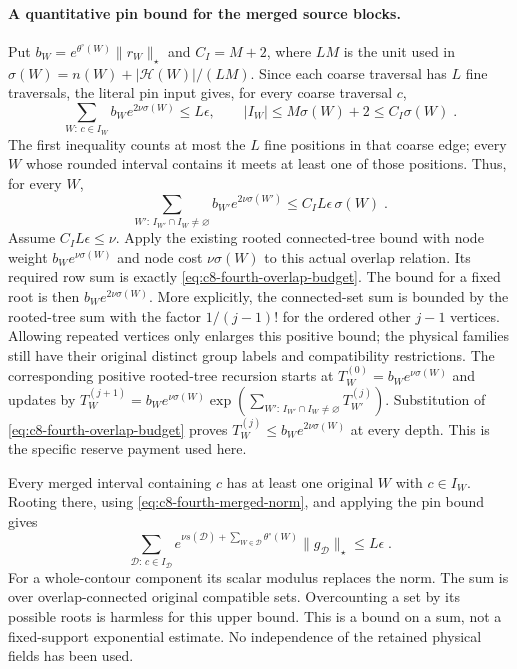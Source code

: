 \documentclass[11pt]{article}
\begin{document}
\paragraph{A quantitative pin bound for the merged source blocks.}
Put $b_W=e^{\theta^\circ(W)}\|r_W\|_\star$ and
$C_I=M+2$, where $LM$ is the unit used in
$\sigma(W)=n(W)+|\mathcal H(W)|/(LM)$. Since each coarse
traversal has $L$ fine traversals, the literal pin input gives,
for every coarse traversal $c$,
\begin{equation}\label{eq:c8-fourth-coarse-pin-input}
    \sum_{W:\,c\in I_W}b_We^{2\nu\sigma(W)}
        \leq L\epsilon,\qquad
    |I_W|\leq M\sigma(W)+2\leq C_I\sigma(W)\;.
\end{equation}
The first inequality counts at most the $L$ fine positions
in that coarse edge; every $W$ whose rounded interval contains
it meets at least one of those positions.
Thus, for every $W$,
\begin{equation}\label{eq:c8-fourth-overlap-budget}
    \sum_{W':\,I_{W'}\cap I_W\neq\varnothing}
        b_{W'}e^{2\nu\sigma(W')}
        \leq C_I L\epsilon\,\sigma(W)\;.
\end{equation}
Assume $C_I L\epsilon\leq\nu$. Apply the existing rooted
connected-tree bound with node weight $b_We^{\nu\sigma(W)}$
and node cost $\nu\sigma(W)$ to this actual overlap relation.
Its required row sum is exactly
\eqref{eq:c8-fourth-overlap-budget}. The bound for a fixed
root is then $b_We^{2\nu\sigma(W)}$. More explicitly, the
connected-set sum is bounded by the rooted-tree sum with the
factor $1/(j-1)!$ for the ordered other $j-1$ vertices.
Allowing repeated vertices only enlarges this positive bound;
the physical families still have their original distinct
group labels and compatibility restrictions.
The corresponding positive rooted-tree recursion starts at
$T_W^{(0)}=b_We^{\nu\sigma(W)}$ and updates by
$T_W^{(j+1)}=b_We^{\nu\sigma(W)}
\exp(\sum_{W':\,I_{W'}\cap I_W\neq\varnothing}T_{W'}^{(j)})$.
Substitution of \eqref{eq:c8-fourth-overlap-budget} proves
$T_W^{(j)}\leq b_We^{2\nu\sigma(W)}$ at every depth.
This is the specific reserve payment used here.

Every merged interval containing $c$ has at least one original
$W$ with $c\in I_W$. Rooting there, using
\eqref{eq:c8-fourth-merged-norm}, and applying the pin bound
gives
\begin{equation}\label{eq:c8-fourth-merged-pin}
    \sum_{\mathcal D:\,c\in I_{\mathcal D}}
        e^{\nu s(\mathcal D)+
            \sum_{W\in\mathcal D}\theta^\circ(W)}
        \|g_{\mathcal D}\|_\star
        \leq L\epsilon\;.
\end{equation}
For a whole-contour component its scalar modulus replaces
the norm. The sum is over overlap-connected original
compatible sets. Overcounting a set by its possible roots
is harmless for this upper bound.
This is a bound on a sum, not a fixed-support exponential
estimate. No independence of the retained physical fields
has been used.
\end{document}
